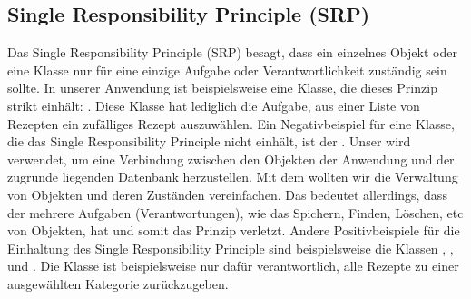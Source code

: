 \subsection{Single Responsibility Principle (SRP)}
Das Single Responsibility Principle (SRP) besagt, dass ein einzelnes Objekt oder eine Klasse nur für eine einzige Aufgabe oder Verantwortlichkeit zuständig sein  sollte.
In unserer Anwendung ist beispielsweise eine Klasse, die dieses Prinzip strikt einhält: \href{https://github.com/MichaelaHaag/RezeptApp/blob/main/1-Adapter/src/main/java/de/rezeptapp/adapter/GUIFunktionen/FunktionenZufallsGenerator.java}{}. Diese Klasse hat lediglich die Aufgabe, aus einer Liste von Rezepten ein \glqq zufälliges\grqq{} Rezept auszuwählen. 
Ein Negativbeispiel für eine Klasse, die das Single Responsibility Principle nicht einhält, ist der \href{https://github.com/MichaelaHaag/RezeptApp/blob/main/1-Adapter/src/main/java/de/rezeptapp/adapter/Datenpersistenz/EntityManager.java}{}. Unser  wird verwendet, um eine Verbindung zwischen den Objekten der Anwendung und der zugrunde liegenden Datenbank herzustellen. Mit dem  wollten wir die Verwaltung von Objekten und deren Zuständen vereinfachen. Das bedeutet allerdings, dass der  mehrere Aufgaben (Verantwortungen), wie das Spichern, Finden, Löschen, etc von Objekten, hat und somit das Prinzip verletzt. 
Andere Positivbeispiele für die Einhaltung des Single Responsibility Principle sind beispielsweise die Klassen \href{https://github.com/MichaelaHaag/RezeptApp/blob/main/1-Adapter/src/main/java/de/rezeptapp/adapter/GUIFunktionen/FunktionenRezeptBearbeiten.java}{}, \href{https://github.com/MichaelaHaag/RezeptApp/blob/main/1-Adapter/src/main/java/de/rezeptapp/adapter/GUIFunktionen/FunktionenNeuesRezept.java}{}, \href{https://github.com/MichaelaHaag/RezeptApp/blob/main/1-Adapter/src/main/java/de/rezeptapp/adapter/GUIFunktionen/ButtonRenderer.java}{} und \href{https://github.com/MichaelaHaag/RezeptApp/blob/main/1-Adapter/src/main/java/de/rezeptapp/adapter/GUIFunktionen/FunktionenListenÜbersicht.java}{}. Die Klasse  ist beispielsweise nur dafür verantwortlich, alle Rezepte zu einer ausgewählten Kategorie zurückzugeben. 


